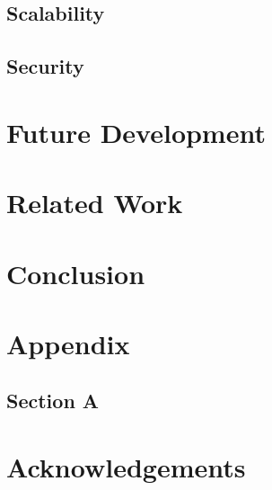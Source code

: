 \documentclass{sig-alternate}
\begin{document}
\subsection{Scalability}

\subsection{Security}

\section{Future Development}

\section{Related Work}

\section{Conclusion}

\section{Appendix}
\subsection{Section A}
  

\section{Acknowledgements}

\nocite{*}


\end{document}
